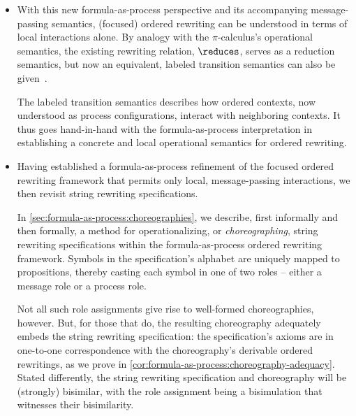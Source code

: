 \begin{itemize}[listparindent=\parindent, itemsep=\dimexpr\itemsep+\parsep\relax, parsep=0pt]

\item
  With this new formula-as-process perspective and its accompanying mes\-sage-passing semantics, (focused) ordered rewriting can be understood in terms of local interactions alone.
  By analogy with the $\pi$-calculus's operational semantics, the existing rewriting relation, $\reduces$, serves as a reduction semantics, but now an equivalent, labeled transition semantics can also be given~.

  The labeled transition semantics describes how ordered contexts, now understood as process configurations, interact with neighboring contexts.
  It thus goes hand-in-hand with the formula-as-process interpretation in establishing a concrete and local operational semantics for ordered rewriting.

\item
  Having established a formula-as-process refinement of the focused ordered rewriting framework that permits only local, message-passing interactions, we then revisit string rewriting specifications.

  In \cref{sec:formula-as-process:choreographies}, we describe, first informally and then formally, a method for operationalizing, or \emph{choreographing}, string rewriting specifications within the formula-as-process ordered rewriting framework.
  Symbols in the specification's alphabet are uniquely mapped to propositions, thereby casting each symbol in one of two roles -- either a message role or a process role.

  Not all such role assignments give rise to well-formed choreographies, however.
  But, for those that do, the resulting choreography adequately embeds the string rewriting specification:
  the specification's axioms are in one-to-one correspondence with the choreography's derivable ordered rewritings, as we prove in \cref{cor:formula-as-process:choreography-adequacy}.
  Stated differently, the string rewriting specification and choreography will be (strongly) bisimilar, with the role assignment being a bisimulation that witnesses their bisimilarity.


\end{itemize}
